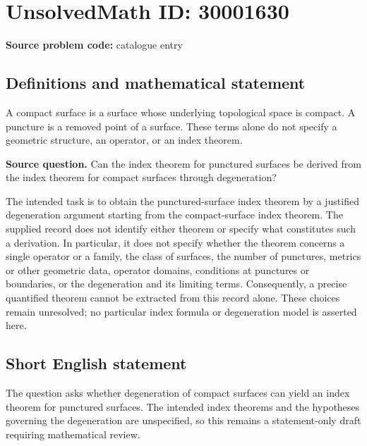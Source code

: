 \documentclass[11pt]{article}
\begin{document}
\section*{UnsolvedMath ID: 30001630}
\textbf{Source problem code:} catalogue entry
\subsection{Definitions and mathematical statement}
A compact surface is a surface whose underlying topological space is compact. A puncture is a removed point of a surface. These terms alone do not specify a geometric structure, an operator, or an index theorem.

\textbf{Source question.} Can the index theorem for punctured surfaces be derived from the index theorem for compact surfaces through degeneration?

The intended task is to obtain the punctured-surface index theorem by a justified degeneration argument starting from the compact-surface index theorem. The supplied record does not identify either theorem or specify what constitutes such a derivation. In particular, it does not specify whether the theorem concerns a single operator or a family, the class of surfaces, the number of punctures, metrics or other geometric data, operator domains, conditions at punctures or boundaries, or the degeneration and its limiting terms. Consequently, a precise quantified theorem cannot be extracted from this record alone. These choices remain unresolved; no particular index formula or degeneration model is asserted here.
\subsection{Short English statement}
The question asks whether degeneration of compact surfaces can yield an index theorem for punctured surfaces. The intended index theorems and the hypotheses governing the degeneration are unspecified, so this remains a statement-only draft requiring mathematical review.
\end{document}
